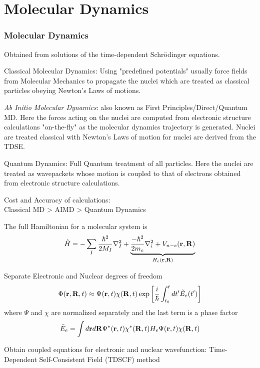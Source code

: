 \documentclass[slidestop,mathserif,compress,xcolor=svgnames]{beamer}
\begin{document}
\section{Molecular Dynamics}
\begin{frame}[allowframebreaks]
\frametitle{\small Molecular Dynamics}
\begin{itemize}
{\footnotesize
\item Obtained from solutions of the time-dependent Schr\"{o}dinger equations.
\item Classical Molecular Dynamics: Using "predefined potentials" usually force fields from Molecular Mechanics to propagate the nuclei which are treated as classical particles obeying Newton's Laws of motions.
\item \textit{Ab Initio Molecular Dynamics}: also known as First Principles/Direct/Quantum MD. Here the forces acting on the nuclei are computed from electronic structure calculations "on-the-fly" as the molecular dynamics trajectory is generated. Nuclei are treated classical with Newton's Laws of motion for nuclei are derived from the TDSE.
\item Quantum Dynamics: Full Quantum treatment of all particles. Here the nuclei are treated as wavepackets whose motion is coupled to that of electrons obtained from electronic structure calculations.
\item Cost and Accuracy of calculations:\\
Classical MD > AIMD > Quantum Dynamics
\item The full Hamiltonian for a molecular system is
\begin{align*}
\hat{H} = -\sum_I\dfrac{\hbar^2}{2M_I}\nabla^2_I +\underbrace{\dfrac{-\hbar^2}{2m_e}\nabla^2_i + V_{n-e}(\bf r,R)}_{H_e(\bf r,R)}
\end{align*}
\item Separate Electronic and Nuclear degrees of freedom
\begin{align*}
\Phi({\bf r},{\bf R},t) \approx \Psi({\bf r},t)\chi({\bf R},t)\exp\left[\dfrac{i}{\hbar}\int^{t}_{t_0}dt^\prime\tilde{E}_e(t^\prime)\right]
\end{align*}
where $\Psi$ and $\chi$ are normalized separately and the last term is a phase factor
\begin{align*}
\tilde{E}_e = \int d{\bf r}d{\bf R}\Psi^\ast({\bf r},t)\chi^\ast({\bf R},t)H_e\Psi({\bf r},t)\chi({\bf R},t)
\end{align*}
\item Obtain coupled equations for electronic and nuclear wavefunction: Time-Dependent Self-Consistent Field (TDSCF) method
}
\end{itemize}
\end{frame}
\end{document}
